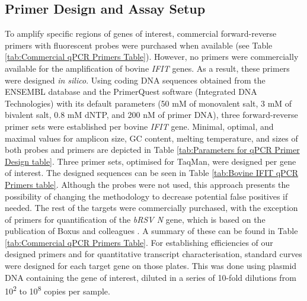 \subsection{Primer Design and Assay Setup} \label{subsec:Primer Design and Assay Setup}
To amplify specific regions of genes of interest, commercial forward-reverse primers with fluorescent probes were purchased when available (see Table \ref{tab:Commercial qPCR Primers Table}). However, no primers were commercially available for the amplification of bovine \textit{IFIT} genes. As a result, these primers were designed \textit{in silico}. Using coding DNA sequences obtained from the ENSEMBL database \cite{Cunningham2022Ensembl2022} and the PrimerQuest software (Integrated DNA Technologies) with its default parameters (50 mM of monovalent salt, 3 mM of bivalent salt, 0.8 mM dNTP, and 200 nM of primer DNA), three forward-reverse primer sets were established per bovine \textit{IFIT} gene. Minimal, optimal, and maximal values for amplicon size, GC content, melting temperature, and sizes of both probes and primers are depicted in Table \ref{tab:Parameters for qPCR Primer Design table}. Three primer sets, optimised for TaqMan, were designed per gene of interest. The designed sequences can be seen in Table \ref{tab:Bovine IFIT qPCR Primers table}. Although the probes were not used, this approach presents the possibility of changing the methodology to decrease potential false positives if needed. The rest of the targets were commercially purchased, with the exception of primers for quantification of the \textit{bRSV N} gene, which is based on the publication of Boxus and colleagues \cite{Boxus2005RealVirus}. A summary of these can be found in Table \ref{tab:Commercial qPCR Primers Table}. For establishing efficiencies of our designed primers and for quantitative transcript characterisation, standard curves were designed for each target gene on those plates. This was done using plasmid DNA containing the gene of interest, diluted in a series of 10-fold dilutions from 10\textsuperscript{2} to 10\textsuperscript{8} copies per sample.

